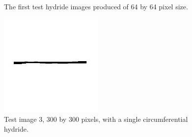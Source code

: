 \documentclass{article}
\begin{document}
    \begin{figure}[H]
		\begin{center}
		\hspace{6pt} 
		\caption{The first test hydride images produced of 64 by 64 pixel size.}
		\label{TestImages64}
		\end{center}
	\end{figure}

    \begin{figure}[H]
        \begin{center}
        \includegraphics[width=2.0in]{Figures/Test_3.jpg} 
        \caption{Test image 3, 300 by 300 pixels, with a single circumferential hydride.}
        \label{TestImage300}
        \end{center}
    \end{figure}
\end{document}
